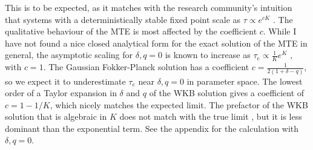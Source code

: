 This is to be expected, as it matches with the research community's intuition that systems with a deterministically stable fixed point scale as $\tau \propto e^{cK}$ \cite{Leigh1981,Lande1993,Kamenev2008,Cremer2009a,Dobrinevski2012,Yu2017}. 
The qualitative behaviour of the MTE is most affected by the coefficient $c$. %
While I have not found a nice closed analytical form for the exact solution of the MTE in general, the asymptotic scaling for $\delta,q = 0$ is known to increase as $\tau_e \propto \frac{1}{K}e^K$ \cite{Lande1993,Lambert2005}, with $c=1$. 
The Gaussian Fokker-Planck solution has a coefficient $c=\frac{1}{2(1+\delta-q)}$, so we expect it to underestimate $\tau_e$ near $\delta,q = 0$ in parameter space. %
The lowest order of a Taylor expansion in $\delta$ and $q$ of the WKB solution gives a coefficient of $c=1-1/K$, which nicely matches the expected limit. 
The prefactor of the WKB solution that is algebraic in $K$ does not match with the true limit \cite{Assaf2010,Badali2019a,Badali2019b}, but it is less dominant than the exponential term. %
See the appendix for the calculation with $\delta,q = 0$. 


